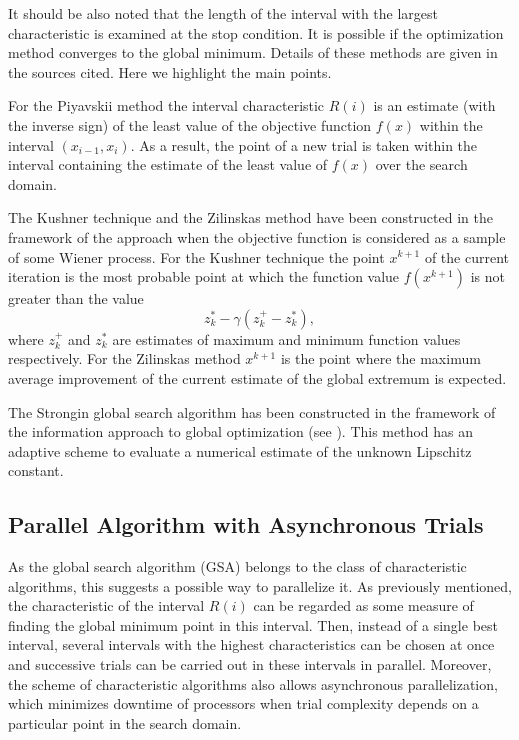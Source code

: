 \documentclass{svproc}
\begin{document}
It should be also noted that the length of the interval with the largest characteristic is examined at the stop condition.
It is possible if the optimization method converges to the global minimum.
Details of these methods are given in the sources cited. %
Here we highlight the main points.

For the Piyavskii method the interval characteristic $R(i)$ is an estimate (with the inverse sign) of the least value of the objective function $f(x)$ within the
interval $(x_{i-1},x_i)$. As a result, the point of a new trial is taken within the interval containing the estimate of the least value of $f(x)$ over the search domain.

The Kushner technique and the Zilinskas method have been constructed in the framework of the approach when the objective function is considered as
a sample of some Wiener process. For the Kushner technique the point $x^{k+1}$ of the current iteration is the most probable point at which the function value
$f(x^{k+1})$ is not greater than the value
\[
z_k^* -\gamma (z_k^+-z_k^*),
\]
where $z_k^+$ and $z_k^*$ are estimates of maximum and minimum function values respectively. For the Zilinskas method $x^{k+1}$ is the point where the maximum average improvement of the current estimate of the global extremum is expected.

The Strongin global search algorithm has been constructed in the framework of the information approach to global optimization (see \cite{Strongin2000}). This method has an adaptive scheme to evaluate a numerical estimate of the unknown Lipschitz constant.


\subsection{Parallel Algorithm with Asynchronous Trials}\label{Sec_PGSA}

As the global search algorithm (GSA) belongs to the class of characteristic algorithms, this suggests a possible way to parallelize it. 
As previously mentioned, the characteristic of the interval $R(i)$ can be regarded as some measure of finding the global minimum point in this interval. Then, instead of a single best interval, several intervals with the highest characteristics can be chosen at once and successive trials can be carried out in these intervals in parallel. Moreover, the scheme of characteristic algorithms also allows asynchronous parallelization, which minimizes downtime of processors when trial complexity depends on a particular point in the search domain. 
\end{document}
